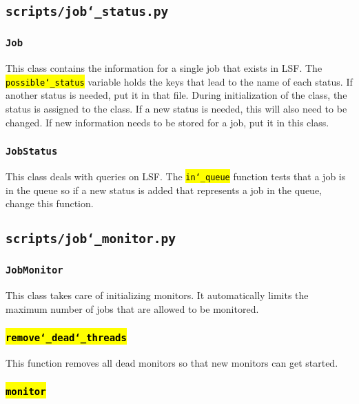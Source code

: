 \documentclass{article}
\newcommand{\un}[0]{\char`_}
\newcommand{\code}[1]{\textcolor{red}{\hl{\texttt{#1}}}}
\begin{document}
\subsection{\texttt{scripts/job\un status.py}}

\subsubsection{\texttt{Job}}

This class contains the information for a single job that exists in LSF. The \mbox{\code{possible\un status}} variable holds the keys that lead to the name of each status. If another status is needed, put it in that file. During initialization of the class, the status is assigned to the class. If a new status is needed, this will also need to be changed. If new information needs to be stored for a job, put it in this class.

\subsubsection{\texttt{JobStatus}}

This class deals with queries on LSF. The \code{in\un queue} function tests that a job is in the queue so if a new status is added that represents a job in the queue, change this function.

\subsection{\texttt{scripts/job\un monitor.py}}

\subsubsection{\texttt{JobMonitor}}

This class takes care of initializing monitors. It automatically limits the maximum number of jobs that are allowed to be monitored.

\subsubsection{\code{remove\un dead\un threads}}

This function removes all dead monitors so that new monitors can get started.

\subsubsection{\code{monitor}}
\end{document}
